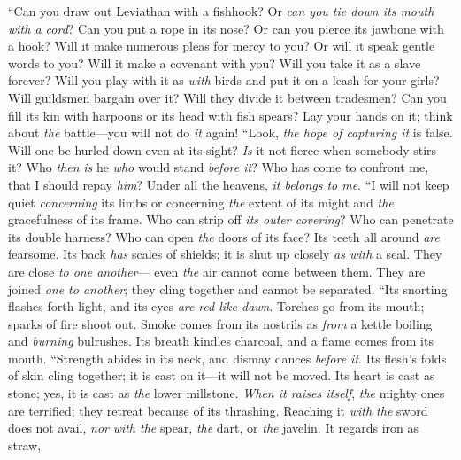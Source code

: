 \begin{biblechapter} %
\verse  “Can you draw out Leviathan with a fishhook? 
Or \textit{can you tie down its mouth with a cord}?
\verse Can you put a rope in its nose? 
Or can you pierce its jawbone with a hook?
\verse Will it make numerous pleas for mercy to you? 
Or will it speak gentle words to you?
\verse Will it make a covenant with you? 
Will you take it as a slave forever?
\verse Will you play with it as \textit{with} birds 
and put it on a leash for your girls?
\verse Will guildsmen bargain over it? 
Will they divide it between tradesmen?
\verse Can you fill its kin with harpoons 
or its head with fish spears?
\verse Lay your hands on it; 
think about \textit{the} battle—you will not do \textit{it} again!
\verse “Look, \textit{the hope of capturing it} is false. 
Will one be hurled down even at its sight?
\verse \textit{Is} it not fierce when somebody stirs it? 
Who \textit{then} \textit{is} he \textit{who} would stand \textit{before it}?
\verse Who has come to confront me, that I should repay \textit{him}? 
Under all the heavens, \textit{it belongs to me}.
\verse “I will not keep quiet \textit{concerning} its limbs 
or concerning \textit{the} extent of its might and \textit{the} gracefulness of its frame.
\verse Who can strip off \textit{its outer covering}? 
Who can penetrate its double harness?
\verse Who can open \textit{the} doors of its face? 
Its teeth all around \textit{are} fearsome.
\verse Its back \textit{has} scales of shields; 
it is shut up closely \textit{as with} a seal.
\verse They are close \textit{to one another}— 
even \textit{the} air cannot come between them.
\verse They are joined \textit{one to another}; 
they cling together and cannot be separated.
\verse “Its snorting flashes forth light, 
and its eyes \textit{are} \textit{red like dawn}.
\verse Torches go from its mouth; 
sparks of fire shoot out.
\verse Smoke comes from its nostrils 
as \textit{from} a kettle boiling and \textit{burning} bulrushes.
\verse Its breath kindles charcoal, 
and a flame comes from its mouth.
\verse “Strength abides in its neck, 
and dismay dances \textit{before it}.
\verse Its flesh’s folds of skin cling together; 
it is cast on it—it will not be moved.
\verse Its heart is cast as stone; 
yes, it is cast as \textit{the} lower millstone.
\verse \textit{When it raises itself}, \textit{the} mighty ones are terrified; 
they retreat because of its thrashing.
\verse Reaching it \textit{with the} sword does not avail, 
\textit{nor} \textit{with the} spear, \textit{the} dart, or \textit{the} javelin.
\verse It regards iron as straw, 

\end{biblechapter}
